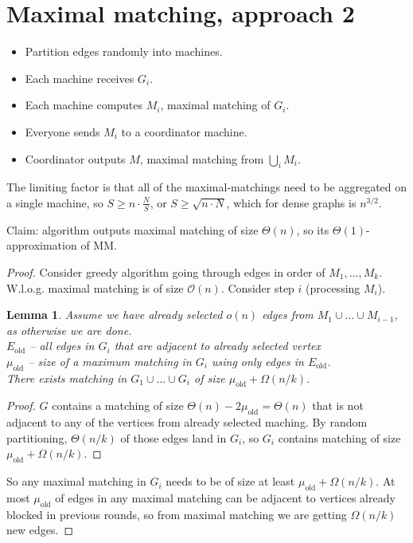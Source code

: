 \documentclass[11pt]{article}
\newtheorem{lemma}[theorem]{Lemma}
\newcommand{\bigo}{\mathcal{O}}
\begin{document}
\section{Maximal matching, approach 2}
\begin{itemize}
\item Partition edges randomly into machines. 
\item Each machine receives $G_i$.
\item Each machine computes $M_i$, maximal matching of $G_i$.
\item Everyone sends $M_i$ to a coordinator machine.
\item Coordinator outputs $M$, maximal matching from $\bigcup_i M_i$.
\end{itemize}

The limiting factor is that all of the maximal-matchings need to be aggregated on a single machine, so $S \ge n \cdot \frac{N}{S}$, or $S \ge \sqrt{n \cdot N}$, which for dense graphs is $n^{3/2}$.

Claim: algorithm outputs maximal matching of size $\Theta(n)$, so its $\Theta(1)$-approximation of MM.

\begin{proof}
Consider greedy algorithm going through edges in order of $M_1,\ldots,M_k$. W.l.o.g. maximal matching is of size $\bigo(n)$. Consider step $i$ (processing $M_i$). 

\begin{lemma}
Assume we have already selected $o(n)$ edges from $M_1 \cup \ldots \cup M_{i-1}$, as otherwise we are done.\\
$E_{\text{old}}$ -- all edges in $G_i$ that are adjacent to already selected vertex\\
$\mu_{\text{old}}$ -- size of a maximum matching in $G_i$ using only edges in $E_{\text{old}}$.\\
There exists matching in $G_1 \cup \ldots \cup G_{i}$ of size $\mu_{\text{old}} + \Omega(n/k)$.
\end{lemma}
\begin{proof}
$G$ contains a matching of size $\Theta(n) - 2 \mu_{\text{old}} = \Theta(n)$ that is not adjacent to any of the vertices from already selected maching. By random partitioning, $\Theta(n/k)$ of those edges land in $G_i$, so $G_i$ contains matching of size $\mu_{\text{old}} + \Omega(n/k)$.
\end{proof}


So any maximal matching in $G_i$ needs to be of size at least $\mu_{\text{old}} + \Omega(n/k)$. At most $\mu_{\text{old}}$ of edges in any maximal matching can be adjacent to vertices already blocked in previous rounds, so from maximal matching we are getting $\Omega(n/k)$ new edges.
\end{proof}
\end{document}
